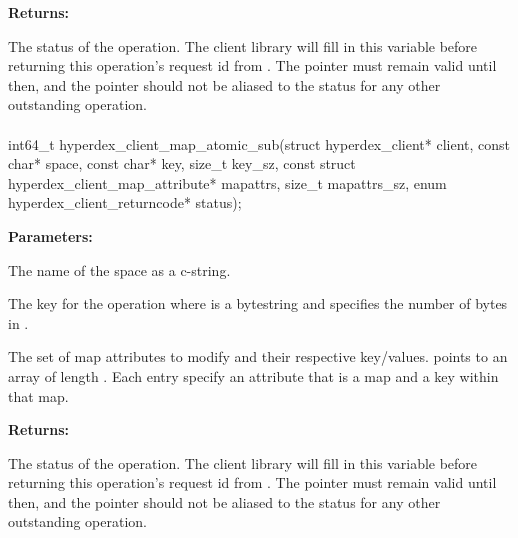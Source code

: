 \noindent\textbf{Returns:}
\begin{description}[labelindent=\widthof{{\code{status}}},leftmargin=*,noitemsep,nolistsep,align=right]
\item[\code{status}] The status of the operation.  The client library will fill in this variable before returning this operation's request id from .  The pointer must remain valid until then, and the pointer should not be aliased to the status for any other outstanding operation.
\end{description}

\paragraph{}
\label{api:c:map_atomic_sub}
\begin{ccode}
int64_t hyperdex_client_map_atomic_sub(struct hyperdex_client* client,
        const char* space,
        const char* key, size_t key_sz,
        const struct hyperdex_client_map_attribute* mapattrs, size_t mapattrs_sz,
        enum hyperdex_client_returncode* status);
\end{ccode}
\funcdesc 

\noindent\textbf{Parameters:}
\begin{description}[labelindent=\widthof{{\code{mapattrs}, \code{mapattrs\_sz}}},leftmargin=*,noitemsep,nolistsep,align=right]
\item[\code{space}] The name of the space as a c-string.
\item[\code{key}, \code{key\_sz}] The key for the operation where  is a bytestring and  specifies the number of bytes in .
\item[\code{mapattrs}, \code{mapattrs\_sz}] The set of map attributes to modify and their respective key/values.   points to an array of length .  Each entry specify an attribute that is a map and a key within that map.
\end{description}

\noindent\textbf{Returns:}
\begin{description}[labelindent=\widthof{{\code{status}}},leftmargin=*,noitemsep,nolistsep,align=right]
\item[\code{status}] The status of the operation.  The client library will fill in this variable before returning this operation's request id from .  The pointer must remain valid until then, and the pointer should not be aliased to the status for any other outstanding operation.
\end{description}

